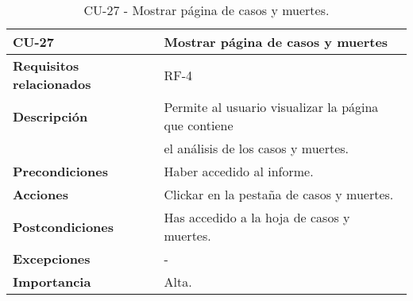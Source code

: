 \begin{table}[ht!]
    \centering
    \resizebox{15cm}{!} {
    \begin{tabular}{|l|l|}
    \hline
         \textbf{CU-27}     &  \textbf{Mostrar página de casos y muertes} \\ \hline
         \textbf{Requisitos relacionados}       & RF-4 \\ \hline
         \textbf{Descripción}    & Permite al usuario visualizar la página que contiene \\&el análisis de los casos y muertes. \\ \hline   
         \textbf{Precondiciones}      & Haber accedido al informe. \\ \hline
         \textbf{Acciones}      & Clickar en la pestaña de casos y muertes. \\ \hline
         \textbf{Postcondiciones}       & Has accedido a la hoja de casos y muertes. \\ \hline
         \textbf{Excepciones}       & - \\ \hline
         \textbf{Importancia}   & Alta. \\
         \hline
    \end{tabular}}
    \caption{CU-27 - Mostrar página de casos y muertes.}
    \label{tab:my_label}
\end{table}




